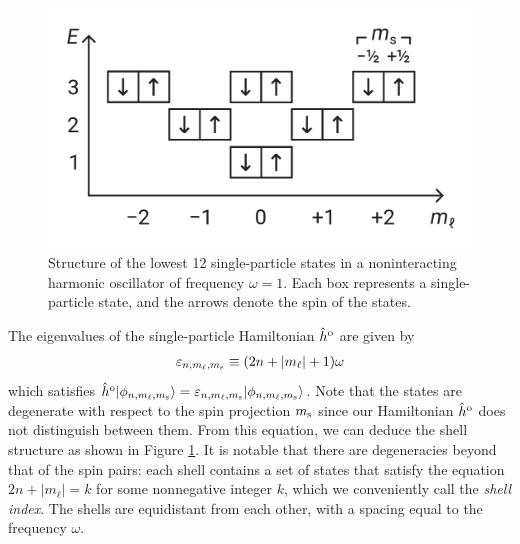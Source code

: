 \begin{figure}
\includegraphics[width=.48\textwidth]{fig-shell-structure}
\caption{Structure of the lowest 12 single-particle states in a noninteracting
  harmonic oscillator of frequency $\omega = 1$.  Each box represents a
  single-particle state, and the arrows denote the spin of the states.}
\label{fig:shell-structure}
\end{figure}
The eigenvalues of the single-particle Hamiltonian $\hat h^{\text o}$ are
given by
\begin{align*}
  \varepsilon_{n, m_\ell, m_{\text s}} \equiv (2 n + |m_\ell| + 1) \omega
\end{align*}
which satisfies
$\hat{h}^{\text o} | \phi_{n, m_\ell, m_{\text s}} \rangle = \varepsilon_{n,
  m_\ell, m_{\text s}} | \phi_{n, m_\ell, m_{\text s}} \rangle$.  Note that the
states are degenerate with respect to the spin projection $m_{\text s}$ since
our Hamiltonian $\hat h^{\text o}$ does not distinguish between them.  From
this equation, we can deduce the shell structure as shown in Figure
\ref{fig:shell-structure}.  It is notable that there are degeneracies beyond
that of the spin pairs: each shell contains a set of states that satisfy the
equation $2 n + |m_\ell| = k$ for some nonnegative integer $k$, which we
conveniently call the \textit{shell index}.  The shells are equidistant from
each other, with a spacing equal to the frequency $\omega$.

